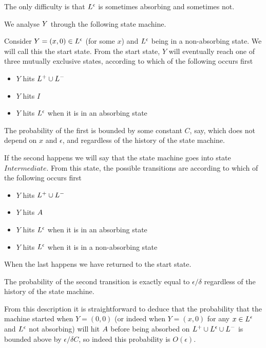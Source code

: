 {The only difficulty is that $L^\epsilon$ is sometimes absorbing and
sometimes not.

We analyse $Y$ through the following state machine.

Consider $Y = (x,0) \in L^\epsilon$ (for some $x$) and $L^\epsilon$ being in
a non-absorbing state.  We will call this the start state.  From the
start state, $Y$ will eventually reach one of three mutually exclusive
states, according to which of the following occurs first

\newcommand{\intermediatelines}{I}

\begin{itemize}
\item $Y$ hits $L^+ \cup L^-$
\item $Y$ hits $\intermediatelines$
\item $Y$ hits $L^\epsilon$ when it is in an absorbing state
\end{itemize}

The probability of the first is bounded by some constant $C$, say,
which does not depend on $x$ and $\epsilon$, and regardless of the
history of the state machine.

\newcommand{\stateintermediate}{Intermediate}

If the second happens we will say that the state machine goes into
state $\stateintermediate$.  From this state, the possible transitions
are according to which of the following occurs first

\begin{itemize}
\item $Y$ hits $L^+ \cup L^-$
\item $Y$ hits $A$
\item $Y$ hits $L^\epsilon$ when it is in an absorbing state
\item $Y$ hits $L^\epsilon$ when it is in a non-absorbing state
\end{itemize}

When the last happens we have returned to the start state.

The probability of the second transition is exactly equal to
$\epsilon/\delta$ regardless of the history of the state machine.

From this description it is straightforward to deduce that the
probability that the machine started when $Y = (0,0)$ (or indeed when
$Y = (x, 0)$ for any $x \in L^\epsilon$ and $L^\epsilon$ not absorbing) will hit
$A$ before being absorbed on $L^+ \cup L^\epsilon \cup L^-$ is
bounded above by $\epsilon/\delta C$, so indeed this probability is
$O(\epsilon)$.

}
